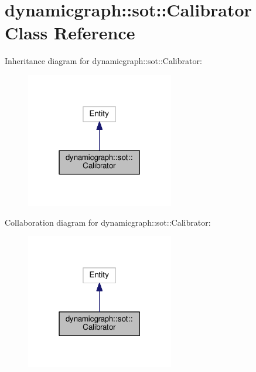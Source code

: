 \hypertarget{classdynamicgraph_1_1sot_1_1Calibrator}{}\section{dynamicgraph\+:\+:sot\+:\+:Calibrator Class Reference}
\label{classdynamicgraph_1_1sot_1_1Calibrator}


Inheritance diagram for dynamicgraph\+:\+:sot\+:\+:Calibrator\+:
\nopagebreak
\begin{figure}[H]
\begin{center}
\leavevmode
\includegraphics[width=183pt]{classdynamicgraph_1_1sot_1_1Calibrator__inherit__graph}
\end{center}
\end{figure}


Collaboration diagram for dynamicgraph\+:\+:sot\+:\+:Calibrator\+:
\nopagebreak
\begin{figure}[H]
\begin{center}
\leavevmode
\includegraphics[width=183pt]{classdynamicgraph_1_1sot_1_1Calibrator__coll__graph}
\end{center}
\end{figure}
